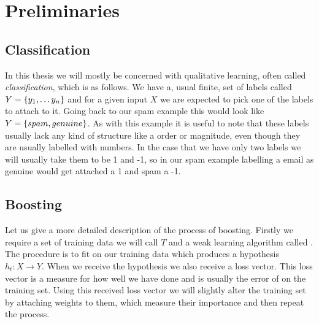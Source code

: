 
\chapter{Preliminaries}
\label{chap:prelim}
\section{Classification} 
\label{sec:class}
 In this thesis we will mostly be concerned with qualitative learning, often called \textit{classification}, which is as follows.  We have a, usual finite, set of labels called $Y=\left\{y_1,\ldots y_n\right\}$ and for a given input $X$ we are expected to pick one of the labels to attach to it. Going back to our spam example this would look like $Y=\left\{spam, genuine\right\}$. As with this example it is useful to note that these labels usually lack any kind of structure like a order or magnitude, even though they are usually labelled with numbers. In the case that we have only two labels we will usually take them to be 1 and -1, so in our spam example labelling a email as genuine would get attached a 1 and spam a -1. 

\section{Boosting}
\label{sec:boost}
Let us give a more detailed description of the process of boosting. Firstly we require a set of training data we will call $T$ and a weak learning algorithm called \weak. The procedure is to fit \weak on our training data which produces a hypothesis $h_t:X\to Y$. When we receive the hypothesis we also receive a loss vector. This loss vector is a measure for how well we have done and is usually the error of \weak on the training set. Using this received loss vector we will slightly alter the training set by attaching weights to them, which measure their importance and then repeat the process. 